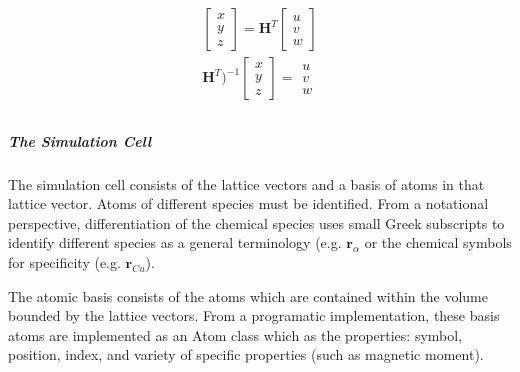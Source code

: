 \documentclass[letterpaper,10pt,english]{sphinxmanual}
\begin{document}
\begin{align*}\!\begin{aligned}
\begin{bmatrix} x \\ y \\ z \end{bmatrix} = \mathbf{H}^T \begin{bmatrix} u \\ v \\ w \end{bmatrix}\\
\mathbf{H}^T)^{-1} \begin{bmatrix} x \\ y \\ z \end{bmatrix} = \begin{matrix} u \\ v \\ w \end{matrix}\\
\end{aligned}\end{align*}

\subparagraph{The Simulation Cell}
\label{\detokenize{crystallography/perfect_crystal:the-simulation-cell}}
The simulation cell consists of the lattice vectors and a basis of atoms in that lattice vector.  Atoms of different species must be identified.  From a notational perspective, differentiation of the chemical species uses small Greek subscripts to identify different species as a general terminology (e.g. \(\mathbf{r}_{\alpha}\) or the chemical symbols for specificity (e.g. \(\mathbf{r}_{Cu}\)).

The atomic basis consists of the atoms which are contained within the volume bounded by the lattice vectors.  From a programatic implementation, these basis atoms are implemented as an Atom class which as the properties: symbol, position, index, and variety of specific properties (such as magnetic moment).
\end{document}

